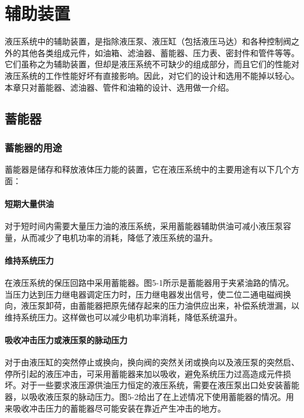 
\chapter{辅助装置}

液压系统中的辅助装置，是指除液压泵、液压缸（包括液压马达）和各种控制阀之外的其他各类组成元件，如油箱、滤油器、蓄能器、压力表、密封件和管件等等。它们虽称之为辅助装置，但却是液压系统不可缺少的组成部分，而且它们的性能对液压系统的工作性能好坏有直接影响。因此，对它们的设计和选用不能掉以轻心。本章只对蓄能器、滤油器、管件和油箱的设计、选用做一介绍。

\section{蓄能器}

\subsection{蓄能器的用途}

蓄能器是储存和释放液体压力能的装置，它在液压系统中的主要用途有以下几个方面：

\subsubsection{短期大量供油}

对于短时间内需要大量压力油的液压系统，采用蓄能器辅助供油可减小液压泵容量，从而减少了电机功率的消耗，降低了液压系统的温升。

\subsubsection{维持系统压力}

在液压系统的保压回路中采用蓄能器。图5-1所示是蓄能器用于夹紧油路的情况。当压力达到压力继电器调定压力时，压力继电器发出信号，使二位二通电磁阀换向，液压泵卸荷，由蓄能器把原先储存起来的压力油供应出来，补偿系统泄漏，以维持系统压力。这样做也可以减少电机功率消耗，降低系统温升。

\subsubsection{吸收冲击压力或液压泵的脉动压力}

对于由液压缸的突然停止或换向，换向阀的突然关闭或换向以及液压泵的突然启、停所引起的液压冲击，可采用蓄能器来加以吸收，避免系统压力过高造成元件损坏。对于一些要求液压源供油压力恒定的液压系统，需要在液压泵出口处安装蓄能器，以吸收液压泵的脉动压力。图5-2给出了在上述情况下使用蓄能器的情况。用来吸收冲击压力的蓄能器尽可能安装在靠近产生冲击的地方。


